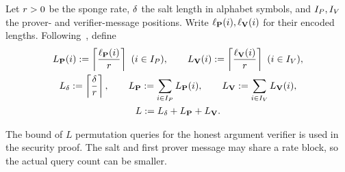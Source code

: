 
\begin{definition}
  \label{def:dsfs_query_error}
  Let \(r>0\) be the sponge rate, \(\delta\) the salt length in alphabet symbols,
  and \(I_P,I_V\) the prover- and verifier-message positions.
  Write \(\ell_{\mathbf{P}}(i),\ell_{\mathbf{V}}(i)\) for their encoded lengths.
  Following~\cite[Eqs.~(7)--(8)]{CO25}, define
  \begin{equation*}
  \begin{gathered}
    \SpongeProverMessageBlockCount(i):=\left\lceil\frac{\IPProverMessageEncodedLength(i)}\SpongeRate\right\rceil\ (i\in \IPProverPositions),\qquad
    \SpongeVerifierMessageBlockCount(i):=\left\lceil\frac{\IPVerifierMessageEncodedLength(i)}\SpongeRate\right\rceil\ (i\in \IPVerifierPositions),\\
    L_{\SaltLength}:=\left\lceil\frac\SaltLength \SpongeRate\right\rceil,\qquad
    \SpongeProverMessageBlockCount:=\sum_{i\in \IPProverPositions}\SpongeProverMessageBlockCount(i),\qquad
    \SpongeVerifierMessageBlockCount:=\sum_{i\in \IPVerifierPositions}\SpongeVerifierMessageBlockCount(i),\\
    L:=L_{\SaltLength}+\SpongeProverMessageBlockCount+\SpongeVerifierMessageBlockCount.
  \end{gathered}
  \end{equation*}
\leanok
\end{definition}

The bound of \(L\) permutation queries for the honest argument verifier is used in the
security proof. The salt and first prover message may share a rate block, so the actual
query count can be smaller.
